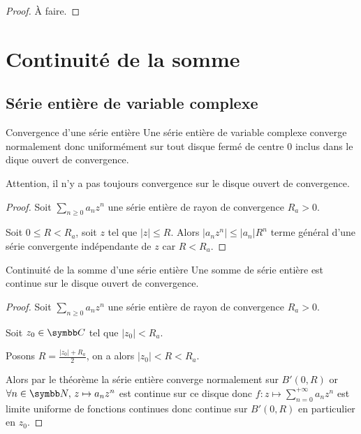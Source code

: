 \begin{proof}
    À faire.
\end{proof}

\section{Continuité de la somme}
\subsection{Série entière de variable complexe}


\begin{theoreme}{Convergence d'une série entière}{}
    Une série entière de variable complexe converge normalement donc uniformément sur tout disque 
    fermé de centre $0$ inclus dans le dique ouvert de convergence. 
\end{theoreme}

\begin{remarque}
    Attention, il n'y a pas toujours convergence sur le disque ouvert de convergence. 
\end{remarque}

\begin{proof}
    Soit $\sum_{n \geqslant 0} a_n z^n$ une série entière de rayon de convergence $R_a > 0$.

    Soit $0 \leqslant R < R_a$, soit $z$ tel que $|z| \leqslant R$. Alors 
    $|a_n z^n| \leqslant |a_n| R^n$ terme général d'une série convergente indépendante de $z$ 
    car $R < R_a$.
\end{proof}

\begin{corollaire}{Continuité de la somme d'une série entière}{}
    Une somme de série entière est continue sur le disque ouvert de convergence.
\end{corollaire}


\begin{proof}
    Soit $\sum_{n \geqslant 0} a_n z^n$ une série entière de rayon de convergence $R_a > 0$.

    Soit $z_0 \in \C$ tel que $|z_0| < R_a$.

    Posons $\displaystyle R = \frac{|z_0| + R_a }{2 }$, on a alors $|z_0| < R < R_a$.

    Alors par le théorème la série entière converge normalement sur $B'(0, R)$ 
    or $\forall n \in \N, \, z \mapsto a_n z^n$ est continue sur ce disque donc 
    $\displaystyle f : z \mapsto \sum_{n = 0}^{+\infty} a_n z^n$ est limite uniforme de fonctions continues 
    donc continue sur $B'(0, R)$ en particulier en $z_0$.


\end{proof}

